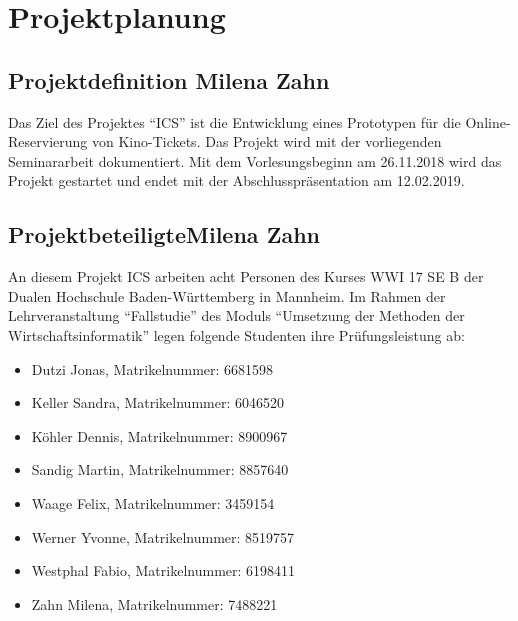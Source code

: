 \chapter{Projektplanung}
	
	\section[Projektdefinition]{Projektdefinition {\hfill \normalsize Milena Zahn}}
	Das Ziel des Projektes \enquote{\ac{ICS}} ist die Entwicklung eines Prototypen für die Online-Reservierung von Kino-Tickets. Das Projekt wird mit der vorliegenden Seminararbeit dokumentiert. Mit dem Vorlesungsbeginn am 26.11.2018 wird das Projekt gestartet und endet mit der Abschlusspräsentation am 12.02.2019.
	
	\section[Projektbeteiligte]{Projektbeteiligte{\hfill \normalsize Milena Zahn}}
	An diesem Projekt \ac{ICS} arbeiten acht Personen des Kurses WWI 17 SE B der Dualen Hochschule Baden-Württemberg in Mannheim. Im Rahmen der Lehrveranstaltung \enquote{Fallstudie} des Moduls \enquote{Umsetzung der Methoden der Wirtschaftsinformatik} legen folgende Studenten ihre Prüfungsleistung ab:
	\begin{singlespacing}
	\begin{itemize}
		\item Dutzi Jonas, Matrikelnummer: 6681598
		\item Keller Sandra, Matrikelnummer: 6046520 
		\item Köhler Dennis, Matrikelnummer: 8900967 
		\item Sandig Martin, Matrikelnummer: 8857640 
		\item Waage Felix, Matrikelnummer: 3459154 
		\item Werner Yvonne, Matrikelnummer: 8519757 
		\item Westphal Fabio, Matrikelnummer: 6198411  
		\item Zahn Milena, Matrikelnummer: 7488221 
	\end{itemize}
	\end{singlespacing}

